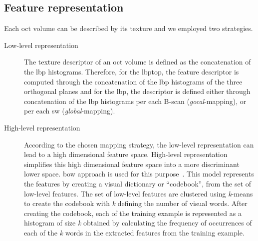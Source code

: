\subsection{Feature representation}\label{subsec:fearep}

Each \ac{oct} volume can be described by its texture and we employed two strategies.

\begin{description}

\item[Low-level representation] The texture descriptor of an \ac{oct} volume is defined as the concatenation of the \ac{lbp} histograms.
Therefore, for the \ac{lbptop}, the feature descriptor is computed through the concatenation of the \ac{lbp} histograms of the three orthogonal planes and for the \ac{lbp}, the descriptor is defined either through concatenation of the \ac{lbp} histograms per each B-scan (\emph{gocal}-mapping), or per each \ac{sw} (\emph{global}-mapping).

\item[High-level representation] According to the chosen mapping strategy, the low-level representation can lead to a high dimensional feature space. 
High-level representation simplifies this high dimensional feature space into a more discriminant lower space. 
\ac{bow} approach is used for this purpose~\cite{Sivic2003}.
This model represents the features by creating a visual dictionary or ``codebook'', from the set of low-level features.
The set of low-level features are clustered using \textit{k}-means to create the codebook with \textit{k} defining the number of visual words.
After creating the codebook, each of the training example is represented as a histogram of size \textit{k} obtained by calculating the frequency of occurrences of each of the \textit{k} words in the extracted features from the training example. 

\end{description}

